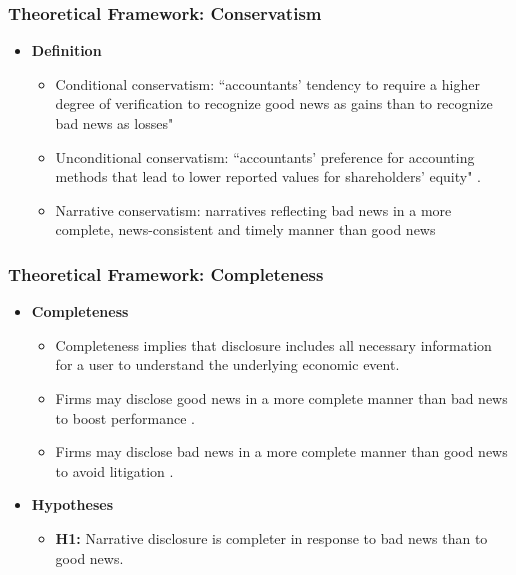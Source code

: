 \documentclass{beamer}
\begin{document}
\begin{frame}
\frametitle{Theoretical Framework: Conservatism}
\begin{itemize}
		
\item \textbf{Definition}

	\begin{itemize}
		\item Conditional conservatism: ``accountants' tendency to require a higher degree of verification to recognize good news as gains than to recognize bad news as losses" \citep*[p. 7]{basuConservatismPrincipleAsymmetric1997}
		\item Unconditional conservatism: ``accountants' preference for accounting methods that lead to lower reported values for shareholders' equity" \citep*[p. 8]{basuConservatismPrincipleAsymmetric1997}.
		\item Narrative conservatism: narratives reflecting bad news in a more complete, news-consistent and timely manner than good news
	\end{itemize}

\end{itemize}
\end{frame}
\begin{frame}
	\frametitle{Theoretical Framework: Completeness}
	\begin{itemize}
\item \textbf{Completeness}

\begin{itemize}
	\item Completeness implies that disclosure includes all necessary information for a user to understand the underlying economic event.
	\item Firms may disclose good news in a more complete manner than bad news to boost performance \citep{teohEarningsManagementUnderperformance1998, langVoluntaryDisclosureEquity2000}.
	\item Firms may disclose bad news in a more complete manner than good news to avoid litigation \citep{skinnerWhyFirmsVoluntarily1994, skinnerEarningsDisclosuresStockholder1997}.
\end{itemize}

\item \textbf{Hypotheses}

\begin{itemize}
	\item  \textbf{H1:} Narrative disclosure is completer in response to bad news than to good news.
\end{itemize}

\end{itemize}
\end{frame}
\end{document}
